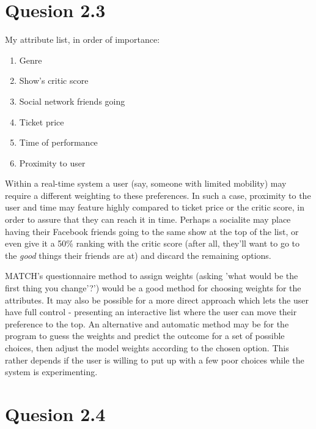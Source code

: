 \documentclass[a4paper,11pt,oneside]{article}
\begin{document}
\section{Quesion 2.3}
My attribute list, in order of importance:
\begin{enumerate}
\item Genre
\item Show's critic score
\item Social network friends going
\item Ticket price
\item Time of performance
\item Proximity to user
\end{enumerate}

Within a real-time system a user (say, someone with limited mobility) may require a different weighting to these preferences. In such a case, proximity to the user and time may feature highly compared to ticket price or the critic score, in order to assure that they can reach it in time. Perhaps a socialite may place having their Facebook friends going to the same show at the top of the list, or even give it a 50\% ranking with the critic score (after all, they'll want to go to the \emph{good} things their friends are at) and discard the remaining options.

MATCH's questionnaire method to assign weights (asking 'what would be the first thing you change'?') would be a good method for choosing weights for the attributes. It may also be possible for a more direct approach which lets the user have full control - presenting an interactive list where the user can move their preference to the top. An alternative and automatic method may be for the program to guess the weights and predict the outcome for a set of possible choices, then adjust the model weights according to the chosen option. This rather depends if the user is willing to put up with a few poor choices while the system is experimenting.


\section{Quesion 2.4}
\end{document}
